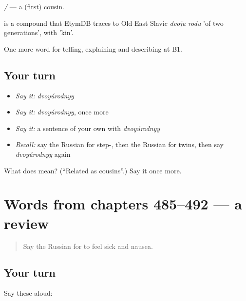 \emph{  /  } — a (first) cousin.

\begin{cousinweb}
\emph{} is a compound that EtymDB traces to Old East Slavic \emph{dvoju rodu} 'of two generations', with \emph{} 'kin'.
\end{cousinweb}

\begin{grammarlens}[title={What you've built}]
One more word for telling, explaining and describing at B1.
\end{grammarlens}

\subsection*{Your turn}
\begin{itemize}
\raggedright
  \item \emph{Say it:} \emph{dvoyúrodnyy}
  \item \emph{Say it:} \emph{dvoyúrodnyy}, once more
  \item \emph{Say it:} a sentence of your own with \emph{dvoyúrodnyy}
  \item \emph{Recall:} say the Russian for step-, then the Russian for twins, then say \emph{dvoyúrodnyy} again
\end{itemize}

\begin{tcolorbox}[breakable,colback=teal!4,colframe=teal!35!black,title={Before you move on}]
What does  mean? (\textquotedblleft{}Related as cousins\textquotedblright{}.) Say it once more.
\end{tcolorbox}
\section[(dialogue)]{Words from chapters 485–492 — a review}

\label{lesson:RU-R492-review-485-492}



\begin{quote}
Say the Russian for to feel sick and nausea.
\end{quote}

\subsection*{Your turn}
Say these aloud:

